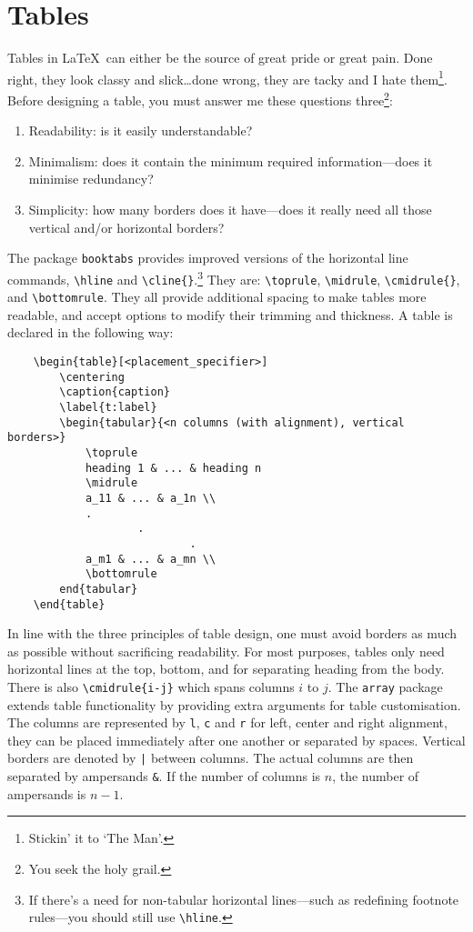 \section{Tables}
%
Tables in \LaTeX~can either be the source of great pride or great pain. Done right, they look classy and slick\ldots done wrong, they are tacky and I hate them\footnote{Stickin' it to `The Man'.}. Before designing a table, you must answer me these questions three\footnote{You seek the holy grail.}:
\begin{enumerate}
    \item Readability: is it easily understandable?
    \item Minimalism: does it contain the minimum required information---does it minimise redundancy?
    \item Simplicity: how many borders does it have---does it really need all those vertical and/or horizontal borders?
\end{enumerate}
The package \verb|booktabs| provides improved versions of the horizontal line commands, \verb|\hline| and \verb|\cline{}|.\footnote{If there's a need for non-tabular horizontal lines---such as redefining footnote rules---you should still use \texttt{\textbackslash hline}.} They are: \verb|\toprule|, \verb|\midrule|, \verb|\cmidrule{}|, and \verb|\bottomrule|. They all provide additional spacing to make tables more readable, and accept options to modify their trimming and thickness. A table is declared in the following way:
\begin{verbatim}
	\begin{table}[<placement_specifier>]
	    \centering
	    \caption{caption}
	    \label{t:label}
	    \begin{tabular}{<n columns (with alignment), vertical borders>}
	        \toprule
	        heading 1 & ... & heading n
	        \midrule
	        a_11 & ... & a_1n \\ 
	        .
	                .
	                        .
	        a_m1 & ... & a_mn \\
	        \bottomrule
	    end{tabular}
	\end{table}
\end{verbatim}

In line with the three principles of table design, one must avoid borders as much as possible without sacrificing readability. For most purposes, tables only need horizontal lines at the top, bottom, and for separating heading from the body. There is also \verb|\cmidrule{i-j}| which spans columns $i$ to $j$. The \verb|array| package extends table functionality by providing extra arguments for table customisation. The columns are represented by \verb|l|, \verb|c| and \verb|r| for left, center and right alignment, they can be placed immediately after one another or separated by spaces. Vertical borders are denoted by \verb+|+ between columns. The actual columns are then separated by ampersands \verb|&|. If the number of columns is $n$, the number of ampersands is $n-1$. 

